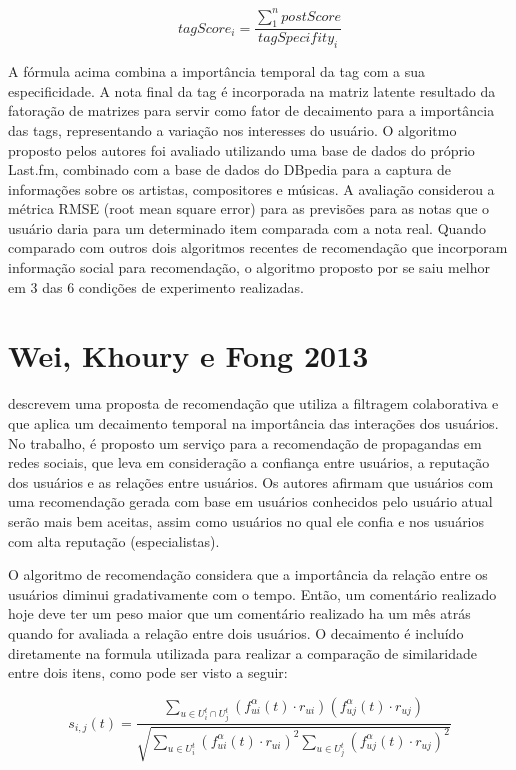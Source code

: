 \begin{equation}
  tagScore_i = \frac{\sum_1^n{postScore}}{tagSpecifity_i}
  \label{eq:kushwaha-nota-final}
\end{equation}

A fórmula acima combina a importância temporal da tag com a sua especificidade. A nota final da tag é incorporada na matriz latente resultado da fatoração de matrizes para servir como fator de decaimento para a importância das tags, representando a variação nos interesses do usuário.
O algoritmo proposto pelos autores foi avaliado utilizando uma base de dados do próprio Last.fm, combinado com a base de dados do DBpedia para a captura de informações sobre os artistas, compositores e músicas. A avaliação considerou a métrica RMSE (root mean square error) para as previsões para as notas que o usuário daria para um determinado item comparada com a nota real. Quando comparado com outros dois algoritmos recentes de recomendação que incorporam informação social para recomendação, o algoritmo proposto por  se saiu melhor em 3 das 6 condições de experimento realizadas.

\section{Wei, Khoury e Fong 2013}

 descrevem uma proposta de recomendação que utiliza a filtragem colaborativa e que aplica um
decaimento temporal na importância das interações dos usuários. No trabalho, é proposto um serviço para a recomendação
de propagandas em redes sociais, que leva em consideração a confiança entre usuários, a reputação dos usuários e as
relações entre usuários. Os autores afirmam que usuários com uma recomendação gerada com base em usuários conhecidos
pelo usuário atual serão mais bem aceitas, assim como usuários no qual ele confia e nos usuários com alta reputação
(especialistas).

O algoritmo de recomendação considera que a importância da relação entre os usuários diminui gradativamente com o tempo.
Então, um comentário realizado hoje deve ter um peso maior que um comentário realizado ha um mês atrás quando for
avaliada a relação entre dois usuários. O decaimento é incluído diretamente na formula utilizada para realizar a
comparação de similaridade entre dois itens, como pode ser visto a seguir:

\begin{equation}
  s_{i,j}(t) = \frac{\sum_{u \in U_i^t \cap U_j^t}{(f_{ui}^\alpha(t) \cdot r_{ui})(f_{uj}^\alpha(t) \cdot r_{uj})}}{\sqrt{\sum_{u \in U_i^t}{(f_{ui}^\alpha(t) \cdot r_{ui})}^2 \sum_{u \in U_j^t}{(f_{uj}^\alpha(t) \cdot r_{uj})}^2}}
  \label{eq:wei-similaridade}
\end{equation}

